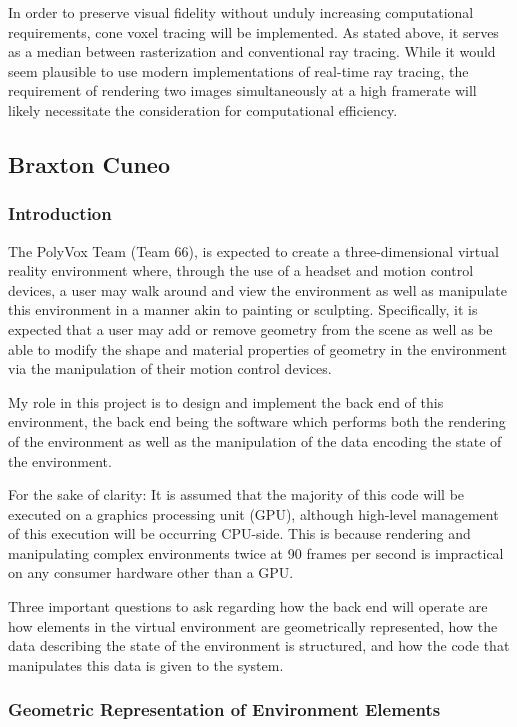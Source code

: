 \documentclass[onecolumn, draftclsnofoot,10pt, compsoc]{IEEEtran}
\newcounter{threesection}[subsubsection]
\begin{document}
In order to preserve visual fidelity without unduly increasing computational requirements, cone voxel tracing will be implemented. As stated above, it serves as a median between rasterization and conventional ray tracing. While it would seem plausible to use modern implementations of real-time ray tracing, the requirement of rendering two images simultaneously at a high framerate will likely necessitate the consideration for computational efficiency.



\pagebreak
\subsection{Braxton Cuneo}
\subsubsection{Introduction}

The PolyVox Team (Team 66), is expected to create a three-dimensional virtual reality environment where, through the use of a headset and motion control devices, a user may walk around and view the environment as well as manipulate this environment in a manner akin to painting or sculpting.
Specifically, it is expected that a user may add or remove geometry from the scene as well as be able to modify the shape and material properties of geometry in the environment via the manipulation of their motion control devices.

My role in this project is to design and implement the back end of this environment, the back end being the software which performs both the rendering of the environment as well as the manipulation of the data encoding the state of the environment.

For the sake of clarity: It is assumed that the majority of this code will be executed on a graphics processing unit (GPU), although high-level management of this execution will be occurring CPU-side.
This is because rendering and manipulating complex environments twice at 90 frames per second is impractical on any consumer hardware other than a GPU.

Three important questions to ask regarding how the back end will operate are how elements in the virtual environment are geometrically represented, how the data describing the state of the environment is structured, and how the code that manipulates this data is given to the system.


\subsubsection{Geometric Representation of Environment Elements}
\end{document}
